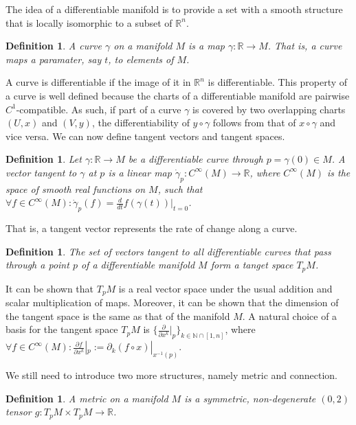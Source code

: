 \documentclass[a4paper,11pt]{elsarticle}
\newtheorem{definition}[theorem]{Definition}
\begin{document}
The idea of a differentiable manifold is to provide a set with a
smooth structure that is locally isomorphic to a subset of
$\mathbb{R}^{n}$.

\begin{definition}
  A curve $\gamma$ on a manifold $M$ is a map $\gamma: \mathbb{R} \to
  M$. That is, a curve maps a paramater, say $t$, to elements of $M$.
\end{definition}

A curve is differentiable if the image of it in $\mathbb{R}^{n}$ is
differentiable. This property of a curve is well defined
because the charts of a differentiable manifold are pairwise
$C^{1}$-compatible. As such, if part of a curve $\gamma$ is covered by
two overlapping charts $(U, x)$ and $(V, y)$, the differentiability of
$y \circ \gamma$ follows from that of $x \circ \gamma$ and vice
versa. We can now define tangent vectors and tangent spaces.
  
\begin{definition}
  Let $\gamma: \mathbb{R} \to M$ be a differentiable curve through $p
  = \gamma(0) \in M$. A vector tangent to $\gamma$ at $p$ is a linear
  map $\dot{\gamma}_{p}: C^{\infty}(M) \to \mathbb{R}$, where
  $C^{\infty}(M)$ is the space of smooth real functions on $M$, such
  that $\forall f \in C^{\infty}(M): \dot{\gamma}_{p}(f) =
  \frac{d}{dt}f(\gamma(t))|_{t = 0}$.
\end{definition}

That is, a tangent vector represents the rate of change along a
curve. 

\begin{definition}
  The set of vectors tangent to all differentiable curves that pass
  through a point $p$ of a differentiable manifold $M$ form a tanget
  space $T_{p}M$.
\end{definition}

It can be shown that $T_{p}M$ is a real vector space under the usual
addition and scalar multiplication of maps. Moreover, it can be shown
that the dimension of the tangent space is the same as that of the
manifold $M$. A natural choice of a basis for the tangent space
$T_{p}M$ is $\{\frac{\partial}{\partial x^{k}}|_{p}\}_{k \in
  \mathbb{N} \cap [1, n]}$, where $\forall f \in C^{\infty}(M):
\frac{\partial f}{\partial x^{k}}|_{p} := \partial_{k}(f \circ
x)|_{x^{-1}(p)}$.

We still need to introduce two more structures, namely metric and
connection.

\begin{definition}
  A metric on a manifold $M$ is a symmetric, non-degenerate $(0, 2)$
  tensor $g: T_{p}M \times T_{p}M \to \mathbb{R}$.
\end{definition}
\end{document}
